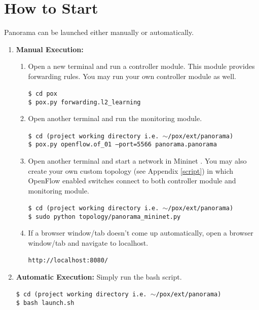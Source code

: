 \documentclass[11pt,a4paper]{report}
\begin{document}
	\chapter{How to Start}
	Panorama can be launched either manually or automatically.
	\begin{enumerate}
		\item \textbf{Manual Execution:} 
		\begin{enumerate}
			\item Open a new terminal and run a controller module. This module provides forwarding rules. You may run your own controller module as well.
			\texttt{\\~\\
				\$ cd pox\\
				\$ pox.py forwarding.l2\_learning}\\
			\item Open another terminal and run the monitoring module.
			\texttt{\\~\\
				\$ cd (project working directory i.e.~$\sim$/pox/ext/panorama)\\
				\$ pox.py openflow.of\_01 --port=5566 panorama.panorama}\\
			\item Open another terminal and start a network in Mininet \cite{Mininet, lantz2010network}. You may also create your own custom topology (see Appendix \ref{script}) in which OpenFlow enabled switches connect to both controller module and monitoring module.
			\texttt{\\~\\
				\$ cd (project working directory i.e.~$\sim$/pox/ext/panorama)\\
				\$ sudo python topology/panorama\_mininet.py}\\
			
			\item If a browser window/tab doesn't come up automatically, open a browser window/tab and navigate to localhost.
			\texttt{\\~\\http://localhost:8080/}\\
		\end{enumerate}				
		
		\item \textbf{Automatic Execution:} Simply run the bash script.
			\texttt{\\~\\
			\$ cd (project working directory i.e.~$\sim$/pox/ext/panorama)\\
			\$ bash launch.sh
			}
	\end{enumerate}
\end{document}

